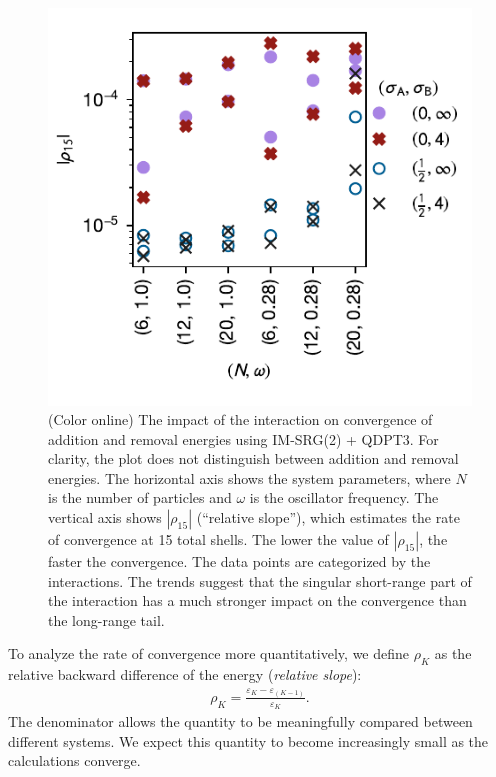 \begin{figure}
  \centering
  \includegraphics{fig-rel-slopes2.pdf}
  \caption{(Color online) The impact of the interaction on convergence of addition and removal energies using IM-SRG(2) + QDPT3.  For clarity, the plot does not distinguish between addition and removal energies.  The horizontal axis shows the system parameters, where $N$ is the number of particles and $\omega$ is the oscillator frequency.  The vertical axis shows $|\rho_{15}|$ (``relative slope''), which estimates the rate of convergence at 15 total shells.  The lower the value of $|\rho_{15}|$, the faster the convergence.  The data points are categorized by the interactions.  The trends suggest that the singular short-range part of the interaction has a much stronger impact on the convergence than the long-range tail.}
  \label{fig:rel-slopes}
\end{figure}

To analyze the rate of convergence more quantitatively, we define $\rho_K$ as the relative backward difference of the energy (\textit{relative slope}):
\begin{align*}
  \rho_K = \frac{\varepsilon_K - \varepsilon_{(K - 1)}}{\varepsilon_K}.
\end{align*}
The denominator allows the quantity to be meaningfully compared between different systems.  We expect this quantity to become increasingly small as the calculations converge.

